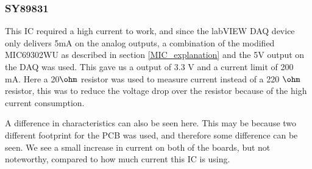 \documentclass[12pt]{article}
\numberwithin{figure}{section}
\begin{document}
\FloatBarrier

\subsubsection{SY89831}
This \ac{IC} required a high current to work, and since the labVIEW DAQ device only delivers 5mA on the analog outputs, a combination of the modified MIC69302WU as described in section \ref{MIC_explanation} and the 5V output on the DAQ was used. This gave us a output of 3.3 V and a current limit of 200 mA. Here a 20$\ohm$ resistor was used to measure current instead of a 220 $\ohm$ resistor, this was to reduce the voltage drop over the resistor because of the high current consumption.

A difference in characteristics can also be seen here. This may be because two different footprint for the PCB was used, and therefore some difference can be seen. We see a small increase in current on both of the boards, but not noteworthy, compared to how much current this IC is using.
\end{document}
